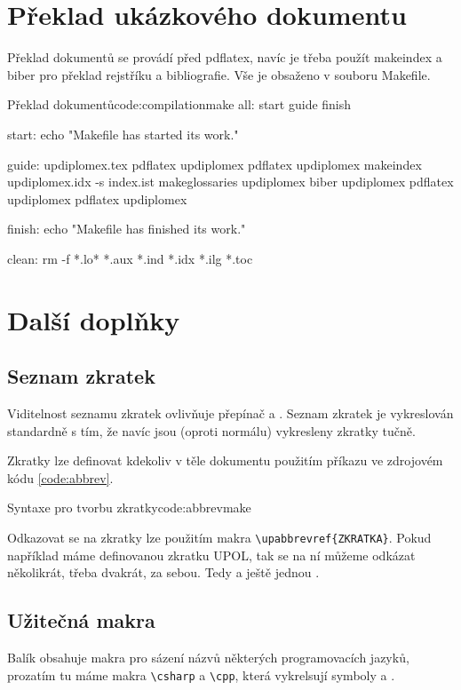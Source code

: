 \documentclass[a4paper,12pt]{article}
\begin{document}
\section{Překlad ukázkového dokumentu}
Překlad dokumentů se provádí před pdflatex, navíc je třeba použít makeindex a biber pro překlad rejstříku a bibliografie. Vše je obsaženo v souboru Makefile.

\begin{upcode}{Překlad dokumentů}{code:compilation}{make}
all: start guide finish

start:
	echo "Makefile has started its work."

guide:	updiplomex.tex
	pdflatex updiplomex
	pdflatex updiplomex
	makeindex updiplomex.idx -s index.ist
	makeglossaries updiplomex
	biber updiplomex
	pdflatex updiplomex
	pdflatex updiplomex

finish:
	echo "Makefile has finished its work."

clean:
	rm -f *.lo* *.aux *.ind *.idx *.ilg *.toc
\end{upcode}

\section{Další doplňky}
\subsection{Seznam zkratek}
Viditelnost seznamu zkratek ovlivňuje přepínač  a . Seznam zkratek je vykreslován standardně s tím, že navíc jsou (oproti normálu) vykresleny zkratky tučně.


Zkratky lze definovat kdekoliv v těle dokumentu použitím příkazu ve zdrojovém kódu \ref{code:abbrev}.

\begin{upcode}{Syntaxe pro tvorbu zkratky}{code:abbrev}{make}
\end{upcode}
Odkazovat se na zkratky lze použitím makra \verb|\upabbrevref{ZKRATKA}|. Pokud například máme definovanou zkratku UPOL, tak se na ní můžeme odkázat několikrát, třeba dvakrát, za sebou. Tedy  a ještě jednou .

\subsection{Užitečná makra}
Balík obsahuje makra pro sázení názvů některých programovacích jazyků, prozatím tu máme makra \verb|\csharp| a \verb|\cpp|, která vykrelsují symboly \csharp a \cpp.
\end{document}
